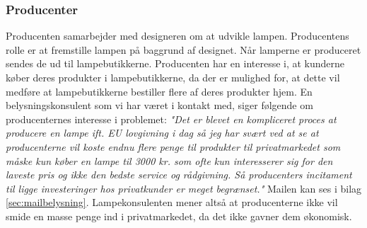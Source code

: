 \subsubsection{Producenter}
Producenten samarbejder med designeren om at udvikle lampen. Producentens rolle er at fremstille lampen på baggrund af designet. Når lamperne er produceret sendes de ud til lampebutikkerne. Producenten har en interesse i, at kunderne køber deres produkter i lampebutikkerne, da der er mulighed for, at dette vil medføre at lampebutikkerne bestiller flere af deres produkter hjem. En belysningskonsulent som vi har været i kontakt med, siger følgende om producenternes interesse i problemet: \textit{"Det er blevet en kompliceret proces at producere en lampe ift. EU lovgivning i dag så jeg har svært ved at se at producenterne vil koste endnu flere penge til produkter til privatmarkedet som måske kun køber en lampe til 3000 kr. som ofte kun interesserer sig for den laveste pris og ikke den bedste service og rådgivning. Så producenters incitament til ligge investeringer hos privatkunder er meget begrænset."} Mailen kan ses i bilag \ref{sec:mailbelysning}. Lampekonsulenten mener altså at producenterne ikke vil smide en masse penge ind i privatmarkedet, da det ikke gavner dem økonomisk. 
